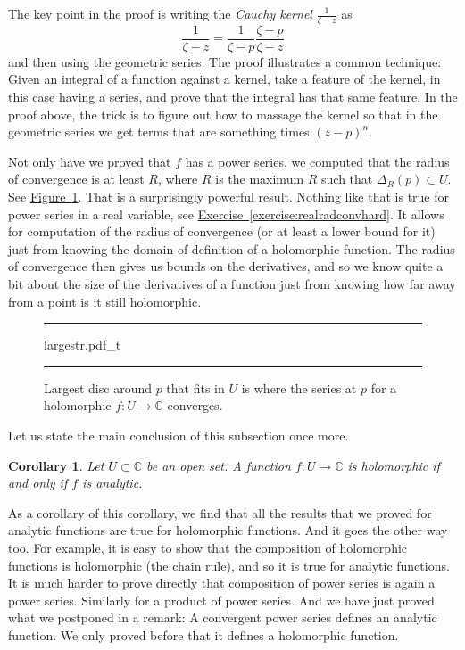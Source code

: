 \documentclass[12pt,openany]{book}
\newcommand{\C}{{\mathbb{C}}}
\newcommand{\myindex}[1]{#1\index{#1}}
\theoremstyle{plain}
\newtheorem{cor}[thm]{Corollary}
\theoremstyle{remark}
\theoremstyle{definition}
\newenvironment{myfig}{%
\begin{figure}[h!t]
\noindent\rule{\textwidth}{0.5pt}\vspace{12pt}\par\centering}%
{\par\noindent\rule{\textwidth}{0.5pt}
\end{figure}}
\theoremstyle{exercise}
\theoremstyle{example}
\newcommand{\figureref}[1]{\hyperref[#1]{Figure~\ref*{#1}}}
\newcommand{\exerciseref}[1]{\hyperref[#1]{Exercise~\ref*{#1}}}
\begin{document}
The key point in the proof is writing the \emph{\myindex{Cauchy kernel}}
$\frac{1}{\zeta-z}$ as
\begin{equation*}
\frac{1}{\zeta-z}
=
\frac{1}{\zeta-p}
\frac{\zeta-p}{\zeta-z}
\end{equation*}
and then using the geometric series.
The proof illustrates a common technique:
Given an
integral of a function against a kernel,
take a feature of the kernel, in this case having a series, and prove that the
integral has that same feature.  In the proof above, the trick is to figure out
how to massage the kernel so that in the geometric series we get terms
that are something times ${(z-p)}^n$.

Not only have we proved
that $f$ has a power series, we computed
that the radius of convergence is at least $R$, where $R$ is the maximum $R$
such that $\Delta_R(p) \subset U$.  See \figureref{fig:largestr}.
That is a surprisingly powerful result.
Nothing like that is true for power series in a real variable,
see \exerciseref{exercise:realradconvhard}.
It allows for computation of the radius of convergence (or at least a lower
bound for it) just from knowing the 
domain of definition of a holomorphic function.  The radius of convergence
then gives us bounds on the derivatives, and so we know quite a bit about
the size of the derivatives of a function just from knowing how far away from a point is
it still holomorphic.

\begin{myfig}
{largestr.pdf_t}
\caption{Largest disc around $p$ that fits in $U$
is where the series at $p$
for a holomorphic $f \colon U \to \C$ converges.%
\label{fig:largestr}}
\end{myfig}

Let us state the main conclusion of this subsection once more.

\begin{cor}
Let $U \subset \C$ be an open set.  A function $f \colon U \to \C$
is holomorphic if and only if $f$ is analytic.
\end{cor}

As a corollary of this corollary, we find that all the results that we proved
for analytic functions are true for holomorphic functions.  And it goes the
other way too.  For example, it is easy to show that the composition of
holomorphic functions is holomorphic (the chain rule), and
so it is true for analytic functions.
It is much harder to prove directly that composition of power series
is again a power series.
Similarly for a product of power series.
And we have just proved what we postponed in a remark: A convergent power
series defines an analytic function.  We only proved before that it defines
a holomorphic function.
\end{document}
